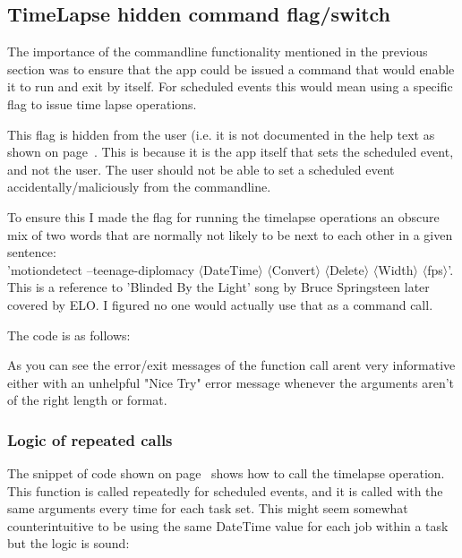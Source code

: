 \subsection{TimeLapse hidden command flag/switch}

The importance of the commandline functionality mentioned in the previous section was to ensure that the app could be issued a command that would enable it to run and exit by itself. For scheduled events this would mean using a specific flag to issue time lapse operations.

This flag is hidden from the user (i.e. it is not documented in the help text as shown on page~\pageref{frame:help}. This is because it is the app itself that sets the scheduled event, and not the user. The user should not be able to set a scheduled event accidentally/maliciously from the commandline.

To ensure this I made the flag for running the timelapse operations an obscure mix of two words that are normally not likely to be next to each other in a given sentence:\\
'motiondetect --teenage-diplomacy \(\langle\)DateTime\(\rangle\) \(\langle\)Convert\(\rangle\) \(\langle\)Delete\(\rangle\) \(\langle\)Width\(\rangle\) \(\langle\)fps\(\rangle\)'. This is a reference to 'Blinded By the Light' song by Bruce Springsteen later covered by ELO. I figured no one would actually use that as a command call.

The code is as follows:
\begin{frame}[fragile]

\label{code:secret}
\end{frame}

As you can see  the error/exit messages of the function call arent very informative either with an unhelpful "Nice Try" error message whenever the arguments aren't of the right length or format. 

\subsubsection{Logic of repeated calls}

The snippet of code shown on page~\pageref{code:secret} shows how to call the timelapse operation. This function is called repeatedly for scheduled events, and it is called with the same arguments every time for each task set. This might seem somewhat counterintuitive to be using the same DateTime value for each job within a task but the logic is sound:

